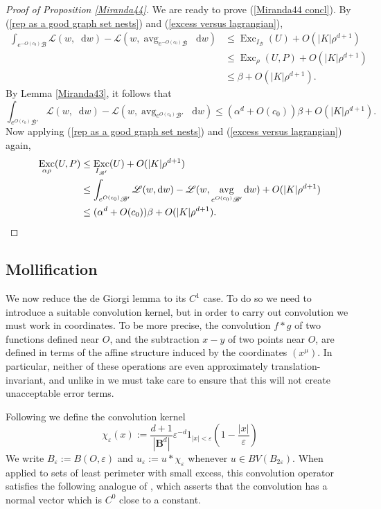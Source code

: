 \documentclass[reqno,11pt]{amsart}
\newcommand{\Ball}{\mathbf{B}}
\DeclareMathOperator{\avg}{avg}
\DeclareMathOperator{\Exc}{Exc}
\newcommand*\dif{\mathop{}\!\mathrm{d}}
\newcommand{\Lagrange}{\mathscr L}
\theoremstyle{definition}
\numberwithin{equation}{section}
\begin{document}
\begin{proof}[Proof of Proposition \ref{Miranda44}]
We are ready to prove (\ref{Miranda44 concl}).
By (\ref{rep as a good graph set nests}) and (\ref{excess versus lagrangian}),
\begin{align*}
\int_{e^{-O(c_0)} \mathscr B} \Lagrange(w, \dif w) - \Lagrange(w, \avg_{e^{-O(c_0)} \mathscr B} \dif w)
&\leq \Exc_{I_{\mathscr B}}(U) + O(|K| \rho^{d + 1}) \\
&\leq \Exc_\rho(U, P) + O(|K| \rho^{d + 1}) \\
&\leq \beta + O(|K| \rho^{d + 1}).
\end{align*}
By Lemma \ref{Miranda43}, it follows that
$$\int_{e^{O(c_0)} \mathscr B'} \Lagrange(w, \dif w) - \Lagrange(w, \avg_{e^{O(c_0)} \mathscr B'} \dif w) \leq (\alpha^d + O(c_0)) \beta + O(|K| \rho^{d + 1}).$$
Now applying (\ref{rep as a good graph set nests}) and (\ref{excess versus lagrangian}) again,
\begin{align*}
\Exc_{\alpha \rho}(U, P)
&\leq \Exc_{I_{\mathscr B'}}(U) + O(|K| \rho^{d + 1}) \\
&\leq \int_{e^{O(c_0)} \mathscr B'} \Lagrange(w, \dif w) - \Lagrange(w, \avg_{e^{O(c_0)} \mathscr B'} \dif w) + O(|K| \rho^{d + 1}) \\
&\leq (\alpha^d + O(c_0)) \beta + O(|K| \rho^{d + 1}). \qedhere
\end{align*}
\end{proof}

\subsection{Mollification}
We now reduce the de Giorgi lemma to its $C^1$ case.
To do so we need to introduce a suitable convolution kernel, but in order to carry out convolution we must work in coordinates.
To be more precise, the convolution $f * g$ of two functions defined near $O$, and the subtraction $x - y$ of two points near $O$, are defined in terms of the affine structure induced by the coordinates $(x^\mu)$.
In particular, neither of these operations are even approximately translation-invariant, and unlike in \cite{Giusti77} we must take care to ensure that this will not create unacceptable error terms.

Following \cite[Chapter 7]{Giusti77} we define the convolution kernel
$$\chi_\varepsilon(x) := \frac{d + 1}{|\Ball^d|} \varepsilon^{-d}1_{|x| < \varepsilon} \left(1 - \frac{|x|}{\varepsilon}\right)$$
We write $B_\varepsilon := B(O, \varepsilon)$ and $u_\varepsilon := u * \chi_\varepsilon$ whenever $u \in BV(B_{2\varepsilon})$.
When applied to sets of least perimeter with small excess, this convolution operator satisfies the following analogue of \cite[Theorem 7.3]{Giusti77}, which asserts that the convolution has a normal vector which is $C^0$ close to a constant.
\end{document}
